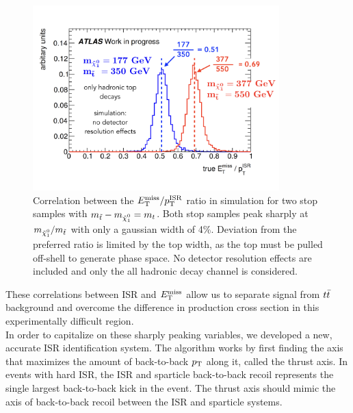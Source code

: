 \begin{figure}[h!]
\centering
    \includegraphics[width=0.85\textwidth]{figures/strategy/RISR_truth.png}\hspace{0.05\textwidth}
\caption[Correlation between the $\met/\PTISR$ ratio in simulation for stop samples with $m_{\stop}-m_{\ninoone} = m_t$]{ Correlation between the $\met/\PTISR$ ratio in simulation for two stop samples with $m_{\stop}-m_{\ninoone} = m_t$.  Both stop samples peak sharply at $m_{\ninoone}/m_{\stop}$ with only a gaussian width of 4\%.  Deviation from the preferred ratio is limited by the top width, as the top must be pulled off-shell to generate phase space. No detector resolution effects are included and only the all hadronic decay channel is considered. }
\label{fig:trueRISR}
\end{figure}

\indent These correlations between ISR and $E_{\mathrm{T}}^{\mathrm{miss}}$ allow us to separate signal from $t\bar{t}$ background and overcome the difference in production cross section in this experimentally difficult region.  \\

\indent In order to capitalize on these sharply peaking variables, we developed a new, accurate ISR identification system.  The algorithm works by first finding the axis that maximizes the amount of back-to-back $p_{\mathrm{T}}$ along it, called the thrust axis.   In events with hard ISR, the ISR and sparticle back-to-back recoil represents the single largest back-to-back kick in the event.  The thrust axis should mimic the axis of back-to-back recoil between the ISR and sparticle systems.  \\

